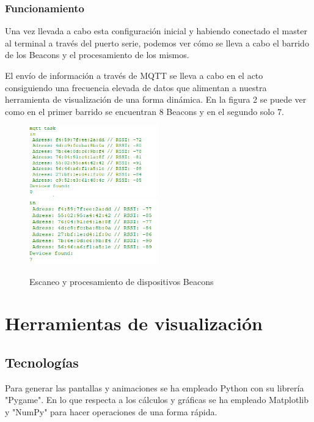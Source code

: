 \documentclass[paper=a4, fontsize=11pt,twoside]{scrartcl}
\begin{document}
        \subsubsection{Funcionamiento}
            Una vez llevada a cabo esta configuración inicial y habiendo conectado el master al terminal a través del puerto serie,
            podemos ver cómo se lleva a cabo el barrido de los Beacons y el procesamiento de los mismos.

            El envío de información a través de MQTT se lleva a cabo en el acto consiguiendo una frecuencia elevada de datos que alimentan a nuestra herramienta 
            de visualización de una forma dinámica. En la figura 2 se puede ver como en el primer barrido se encuentran 8 Beacons y en el segundo solo 7.
            \begin{center}
                \begin{figure}[]
                    \centering
                    \includegraphics[width=0.5\textwidth]{../../Memmory/images/s_scanning_1.PNG}
                    \includegraphics[width=0.5\textwidth]{../../Memmory/images/s_scanning_2.PNG}
                    \caption{Escaneo y procesamiento de dispositivos Beacons}
                    \label{fig:mesh13}
                \end{figure}
            \end{center}
\section{Herramientas de visualización}
    \subsection{Tecnologías}
        Para generar las pantallas y animaciones se ha empleado Python con su librería "Pygame". En lo que respecta a los cálculos 
        y gráficas se ha empleado Matplotlib y "NumPy" para hacer operaciones de una forma rápida.  
\end{document}

